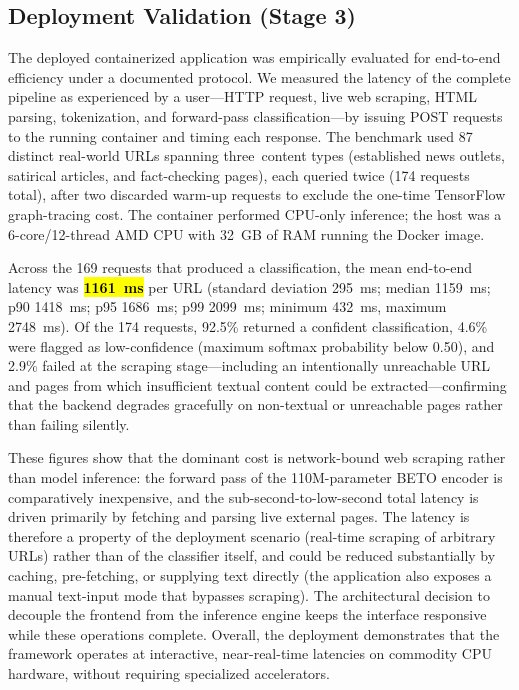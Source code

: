\documentclass[informatics,article,accept,pdftex,moreauthors]{Definitions/mdpi}
\begin{document}
\subsection{Deployment Validation (Stage 3)}\label{sec:deployment-validation}
The deployed containerized application was empirically evaluated for end-to-end efficiency under a documented protocol. We measured the latency of the complete pipeline as experienced by a user—HTTP request, live web scraping, HTML parsing, tokenization, and forward-pass classification—by issuing POST requests to the running container and timing each response. The benchmark used 87 distinct real-world URLs spanning \mbox{three content} types (established news outlets, satirical articles, and fact-checking pages), each queried twice (174 requests total), after two discarded warm-up requests to exclude the one-time TensorFlow graph-tracing cost. The container performed CPU-only inference; the host was a 6-core/12-thread AMD CPU with 32~GB of RAM running the Docker image.

Across the 169 requests that produced a classification, the mean end-to-end latency was \textbf{\hl{1161~ms}} per URL (standard deviation 295~ms; median 1159~ms; p90 1418~ms; p95 1686~ms; p99 2099~ms; minimum 432~ms, maximum 2748~ms). Of the 174 requests, 92.5\% returned a confident classification, 4.6\% were flagged as low-confidence (maximum softmax probability below 0.50), and 2.9\% failed at the scraping stage—including an intentionally unreachable URL and pages from which insufficient textual content could be extracted—confirming that the backend degrades gracefully on non-textual or unreachable pages rather than failing silently.

These figures show that the dominant cost is network-bound web scraping rather than model inference: the forward pass of the 110M-parameter BETO encoder is comparatively inexpensive, and the sub-second-to-low-second total latency is driven primarily by fetching and parsing live external pages. The latency is therefore a property of the deployment scenario (real-time scraping of arbitrary URLs) rather than of the classifier itself, and could be reduced substantially by caching, pre-fetching, or supplying text directly (the application also exposes a manual text-input mode that bypasses scraping). The architectural decision to decouple the frontend from the inference engine keeps the interface responsive while these operations complete. Overall, the deployment demonstrates that the framework operates at interactive, near-real-time latencies on commodity CPU hardware, without requiring specialized accelerators.
\end{document}
